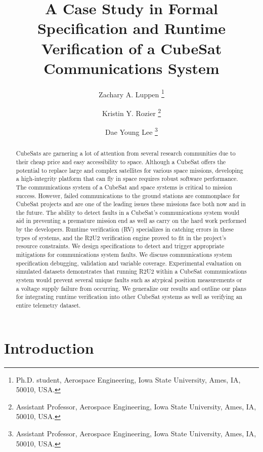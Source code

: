 \documentclass[conf]{new-aiaa}
\title{A Case Study in Formal Specification and Runtime Verification of a CubeSat Communications System}
\author{Zachary A. Luppen \footnote{Ph.D. student, Aerospace Engineering, Iowa State University, Ames, IA, 50010, USA.}}
\author{Kristin Y. Rozier \footnote{Assistant Professor, Aerospace Engineering, Iowa State University, Ames, IA, 50010, USA.}}
\author{Dae Young Lee \footnote{Assistant Professor, Aerospace Engineering, Iowa State University, Ames, IA, 50010, USA.}}
\affil{Iowa State University, Ames, Iowa, 50011, USA.}
\begin{document}
\maketitle

\begin{abstract}

CubeSats are garnering a lot of attention from several research communities due to their cheap price and easy accessibility to space. Although a CubeSat offers the potential to replace large and complex satellites for various space missions, developing a high-integrity platform that can fly in space requires robust software performance. The communications system of a CubeSat and space systems 
is critical to mission success. However, failed communications to the ground stations are commonplace for CubeSat projects and are one of the leading issues these missions face both now and in the future. The ability to detect faults in a CubeSat's communications system would aid in preventing a premature mission end as well as carry on the hard work performed by the developers. Runtime verification (RV) specializes in catching errors in these types of systems, and the R2U2 verification engine proved to fit in the project's resource constraints. We design specifications to detect and trigger appropriate mitigations for communications system faults. We discuss communications system specification debugging, validation and variable coverage. Experimental evaluation on simulated datasets demonstrates that running R2U2 within a CubeSat communications system would prevent several unique faults such as atypical position measurements or a voltage supply failure from occurring. We generalize our results and outline our plans for integrating runtime verification into other CubeSat systems as well as verifying an entire telemetry dataset.

\end{abstract}


\section{Introduction}
\end{document}
